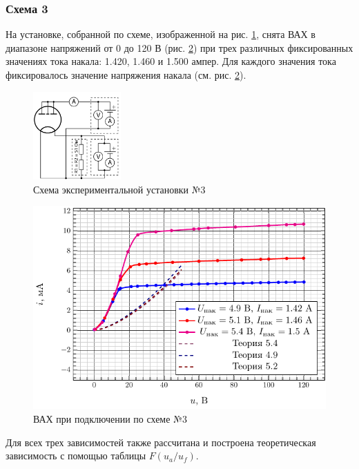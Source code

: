 \documentclass[a5paper,11pt]{extarticle}
\begin{document}
\subsubsection{Схема 3}
На установке, собранной  по схеме, изображенной на рис. \ref{fig:chem3}, снята ВАХ в диапазоне напряжений от 0 до 120 В (рис. \ref{fig:vax3}) при трех различных фиксированных значениях тока накала: 1.420, 1.460 и 1.500 ампер. Для каждого значения тока фиксировалось значение напряжения накала (см. рис. \ref{fig:vax3}).
\begin{figure}[H]
	\centering
	\includegraphics[width=0.3\textwidth]{img/z3.jpg}
	\vspace{-1em}
	\caption{Схема экспериментальной установки №3}
	\label{fig:chem3}
\end{figure}
\begin{figure}[H]
	\centering
	\includegraphics[]{fig/i_from_u_3.pdf}
	\vspace{-1em}
	\caption{ВАХ при подключении по схеме №3}
	\label{fig:vax3}
\end{figure}

Для всех трех зависимостей также рассчитана и построена теоретическая зависимость с помощью таблицы $F(u_a/u_f)$.
\end{document}
